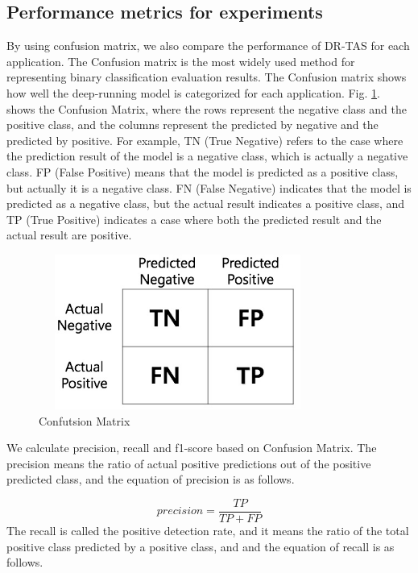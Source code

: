 \documentclass[10pt, twoside, jounal]{IEEEtran}
\begin{document}
\subsection{Performance metrics for experiments}
By using confusion matrix, we also compare the performance of DR-TAS for each application.
The Confusion matrix is ​​the most widely used method for representing binary classification evaluation results.
The Confusion matrix shows how well the deep-running model is categorized for each application.
Fig. \ref{fig3}. shows the Confusion Matrix, where the rows represent the negative class and the positive class, and the columns represent the predicted by negative and the predicted by positive.
For example, TN (True Negative) refers to the case where the prediction result of the model is a negative class, which is actually a negative class.
FP (False Positive) means that the model is predicted as a positive class, but actually it is a negative class.
FN (False Negative) indicates that the model is predicted as a negative class, but the actual result indicates a positive class, and TP (True Positive) indicates a case where both the predicted result and the actual result are positive.
\begin{figure}[!t]
\centering
\setlength{\abovecaptionskip}{0pt}
\setlength{\belowcaptionskip}{0pt}
{
\includegraphics[width=3.6in, height=2.0in]{fig3.jpg}
\caption{Confutsion Matrix}
\label{fig3}
}
\end{figure}

We calculate precision, recall and f1-score based on Confusion Matrix.
The precision means the ratio of actual positive predictions out of the positive predicted class, and the
equation of precision is as follows.

\begin{equation}
precision = \frac{TP}{TP + FP}
\end{equation}
The recall is called the positive detection rate, and it means the ratio of the total positive class predicted by a positive class, and and the equation of recall is as follows.
\end{document}
